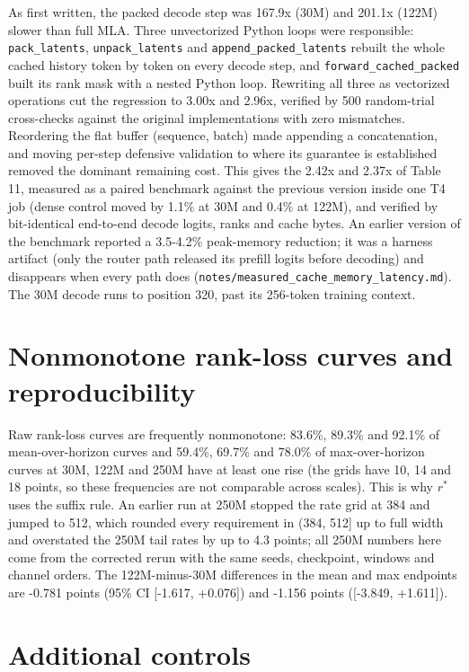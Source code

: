 \documentclass[11pt]{article}
\begin{document}
As first written, the packed decode step was 167.9x (30M) and 201.1x (122M) slower than full MLA. Three unvectorized Python loops were responsible: \texttt{pack\_latents}, \texttt{unpack\_latents} and \texttt{append\_packed\_latents} rebuilt the whole cached history token by token on every decode step, and \texttt{forward\_cached\_packed} built its rank mask with a nested Python loop. Rewriting all three as vectorized operations cut the regression to 3.00x and 2.96x, verified by 500 random-trial cross-checks against the original implementations with zero mismatches. Reordering the flat buffer (sequence, batch) made appending a concatenation, and moving per-step defensive validation to where its guarantee is established removed the dominant remaining cost. This gives the 2.42x and 2.37x of Table 11, measured as a paired benchmark against the previous version inside one T4 job (dense control moved by 1.1\% at 30M and 0.4\% at 122M), and verified by bit-identical end-to-end decode logits, ranks and cache bytes. An earlier version of the benchmark reported a 3.5-4.2\% peak-memory reduction; it was a harness artifact (only the router path released its prefill logits before decoding) and disappears when every path does (\texttt{notes/\allowbreak measured\_cache\_memory\_latency.md}). The 30M decode runs to position 320, past its 256-token training context.

\section{Nonmonotone rank-loss curves and reproducibility}

Raw rank-loss curves are frequently nonmonotone: 83.6\%, 89.3\% and 92.1\% of mean-over-horizon curves and 59.4\%, 69.7\% and 78.0\% of max-over-horizon curves at 30M, 122M and 250M have at least one rise (the grids have 10, 14 and 18 points, so these frequencies are not comparable across scales). This is why $r^*$ uses the suffix rule. An earlier run at 250M stopped the rate grid at 384 and jumped to 512, which rounded every requirement in (384, 512] up to full width and overstated the 250M tail rates by up to 4.3 points; all 250M numbers here come from the corrected rerun with the same seeds, checkpoint, windows and channel orders. The 122M-minus-30M differences in the mean and max endpoints are -0.781 points (95\% CI [-1.617, +0.076]) and -1.156 points ([-3.849, +1.611]).

\section{Additional controls}
\end{document}
